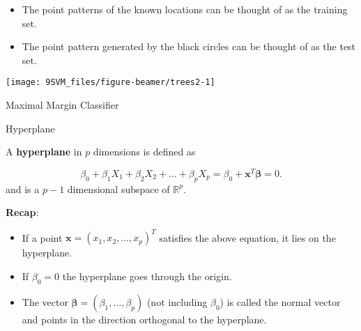 \documentclass[10pt,ignorenonframetext,]{beamer}
\begin{document}
\begin{frame}

\begin{itemize}
\item
  The point patterns of the known locations can be thought of as the
  training set.
\item
  The point pattern generated by the black circles can be thought of as
  the test set.
\end{itemize}

\vspace{4mm}

\begin{center}\texttt{[image: 9SVM\_files/figure-beamer/trees2-1]} \end{center}

\end{frame}

\begin{frame}{Maximal Margin Classifier}
\protect\hypertarget{maximal-margin-classifier}{}

\begin{block}{Hyperplane}

\vspace{2mm}

A \textbf{hyperplane} in \(p\) dimensions is defined as

\[\beta_0+\beta_1 X_1 + \beta_2 X_2 +...+\beta_p X_p=\beta_0+{\boldsymbol x}^T {\boldsymbol \beta}=0.\]
and is a \(p-1\) dimensional subspace of \(\mathbb{R}^p\).

\vspace{5mm}

\textbf{Recap}:

\begin{itemize}
\item
  If a point \({\boldsymbol x}=(x_1,x_2,...,x_p)^T\) satisfies the above
  equation, it lies on the hyperplane.
\item
  If \(\beta_0=0\) the hyperplane goes through the origin.
\item
  The vector \({\boldsymbol \beta}=(\beta_1, \ldots, \beta_p)\) (not
  including \(\beta_0\)) is called the normal vector and points in the
  direction orthogonal to the hyperplane.
\end{itemize}

\end{block}

\end{frame}
\end{document}
